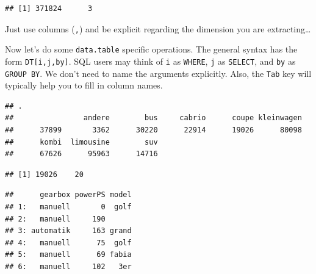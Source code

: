\documentclass[]{book}
\newenvironment{Shaded}{\begin{snugshade}}{\end{snugshade}}
\newcommand{\CommentTok}[1]{\textcolor[rgb]{0.56,0.35,0.01}{\textit{#1}}}
\newcommand{\NormalTok}[1]{#1}
\newcommand{\OperatorTok}[1]{\textcolor[rgb]{0.81,0.36,0.00}{\textbf{#1}}}
\newcommand{\StringTok}[1]{\textcolor[rgb]{0.31,0.60,0.02}{#1}}
\theoremstyle{definition}
\theoremstyle{definition}
\theoremstyle{definition}
\theoremstyle{remark}
\begin{document}
\begin{verbatim}
## [1] 371824      3
\end{verbatim}

Just use columns (\texttt{,}) and be explicit regarding the dimension you are extracting\ldots{}

Now let's do some \texttt{data.table} specific operations.
The general syntax has the form \texttt{DT{[}i,j,by{]}}.
SQL users may think of \texttt{i} as \texttt{WHERE}, \texttt{j} as \texttt{SELECT}, and \texttt{by} as \texttt{GROUP\ BY}.
We don't need to name the arguments explicitly.
Also, the \texttt{Tab} key will typically help you to fill in column names.

\begin{Shaded}
\end{Shaded}

\begin{verbatim}
## .
##                andere        bus     cabrio      coupe kleinwagen 
##      37899       3362      30220      22914      19026      80098 
##      kombi  limousine        suv 
##      67626      95963      14716
\end{verbatim}

\begin{Shaded}
\end{Shaded}

\begin{verbatim}
## [1] 19026    20
\end{verbatim}

\begin{Shaded}
\end{Shaded}

\begin{verbatim}
##      gearbox powerPS model
## 1:   manuell       0  golf
## 2:   manuell     190      
## 3: automatik     163 grand
## 4:   manuell      75  golf
## 5:   manuell      69 fabia
## 6:   manuell     102   3er
\end{verbatim}
\end{document}
